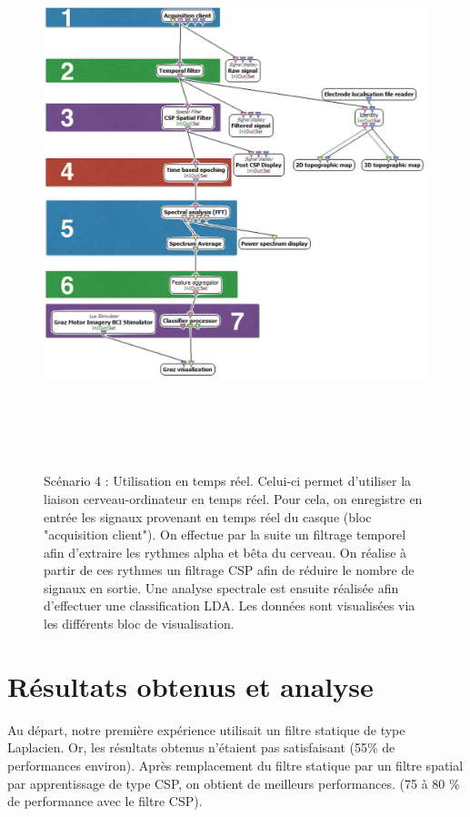 \begin{figure}[h]
	\centering\includegraphics[height=16cm]{images/scenario4.png}
	\caption[Scénario 4 : Utilisation en temps réel]{Scénario 4 : Utilisation en temps réel. Celui-ci permet d'utiliser la liaison cerveau-ordinateur en temps réel. Pour cela, on enregistre en entrée les signaux provenant en temps réel du casque (bloc "acquisition client"). On effectue par la suite un filtrage temporel afin d'extraire les rythmes alpha et bêta du cerveau. On réalise à partir de ces rythmes un filtrage CSP afin de réduire le nombre de signaux en sortie. Une analyse spectrale est ensuite réalisée afin d'effectuer une classification LDA. Les données sont visualisées via les différents bloc de visualisation.}
	\label{scena4}
\end{figure}





\section {Résultats obtenus et analyse}
\label{Section : 6.Résultats obtenus et analyse}
Au départ, notre première expérience utilisait un filtre statique de type Laplacien. Or, les résultats obtenus n'étaient pas satisfaisant (55\% de performances environ). Après remplacement du filtre statique par un filtre spatial par apprentissage de type CSP, on obtient de meilleurs performances. (75 à 80 \% de performance avec le filtre CSP).

